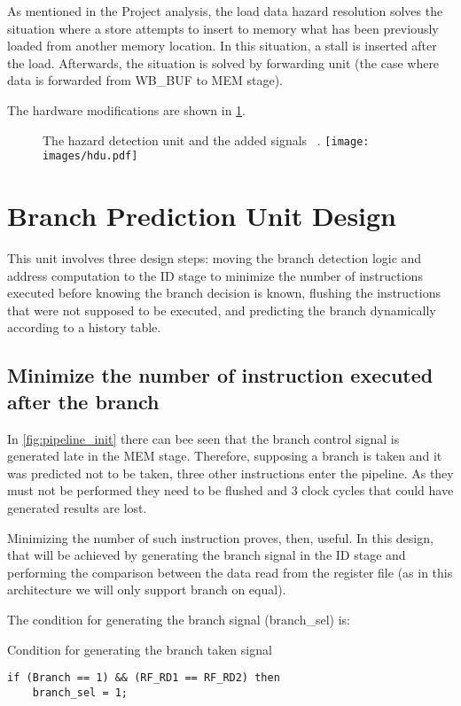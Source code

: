 \documentclass[a4paper,12pt]{report}
\begin{document}
As mentioned in the Project analysis, the load data hazard resolution solves the situation where a store attempts to insert to memory what has been previously loaded from another memory location. In this situation, a stall is inserted after the load.  Afterwards, the situation is solved by forwarding unit (the case where data is forwarded from WB\_BUF to MEM stage).

The hardware modifications are shown in \ref{fig:hdu}.

\begin{figure}
    \begin{my-figure}{The hazard detection unit and the added signals ~\cite{patterson2014computer}.}
        \centering
        \texttt{[image: images/hdu.pdf]}
        \label{fig:hdu}
    \end{my-figure}
\end{figure}

\section{Branch Prediction Unit Design}
This unit involves three design steps: moving the branch detection logic and address computation to the ID stage to minimize the number of instructions executed before knowing the branch decision is known, flushing the instructions that were not supposed to be executed, and predicting the branch dynamically according to a history table.
\subsection{Minimize the number of instruction executed after the branch}
In \ref{fig:pipeline_init} there can bee seen that the branch control signal is generated late in the MEM stage. Therefore, supposing a branch is taken and it was predicted not to be taken, three other instructions enter the pipeline. As they must not be performed they need to be flushed and 3 clock cycles that could have generated results are lost.

Minimizing the number of such instruction proves, then, useful. In this design, that will be achieved by generating the branch signal in the ID stage and performing the comparison between the data read from the register file (as in this architecture we will only support branch on equal).

The condition for generating the branch signal (branch\_sel) is:
\begin{my-listing}{Condition for generating the branch taken signal}
\begin{lstlisting}[style=vhdl]
if (Branch == 1) && (RF_RD1 == RF_RD2) then
    branch_sel = 1;
\end{lstlisting}
\end{my-listing}
\end{document}
